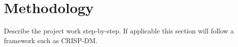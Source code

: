 \chapter{Methodology}

Describe the project work step-by-step. If applicable 
this section will follow a framework such as CRISP-DM.